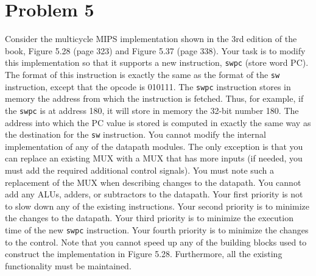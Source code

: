 \documentclass[10pt,letterpaper]{article}
\begin{document}
\section{Problem 5}
Consider the multicycle MIPS implementation shown in the 3rd edition of the book, Figure 5.28 (page 323) and Figure 5.37 (page 338). Your task is to modify this implementation so that it supports a new instruction, \texttt{swpc} (store word PC). The format of this instruction is exactly the same as the format of the \texttt{sw} instruction, except that the opcode is 010111. The \texttt{swpc} instruction stores in memory the address from which the instruction is fetched. Thus, for example, if the \texttt{swpc} is at address 180, it will store in memory the 32-bit number 180. The address into which the PC value is stored is computed in exactly the same way as the destination for the \texttt{sw} instruction. You cannot modify the internal implementation of any of the datapath modules. The only exception is that you can replace an existing MUX with a MUX that has more inputs (if needed, you must add the required additional control signals). You must note such a replacement of the MUX when describing changes to the datapath. You cannot add any ALUs, adders, or subtractors to the datapath. Your first priority is not to slow down any of the existing instructions. Your second priority is to minimize the changes to the datapath. Your third priority is to minimize the execution time of the new \texttt{swpc} instruction. Your fourth priority is to minimize the changes to the control. Note that you cannot speed up any of the building blocks used to construct the implementation in Figure 5.28. Furthermore, all the existing functionality must be maintained.
\end{document}

